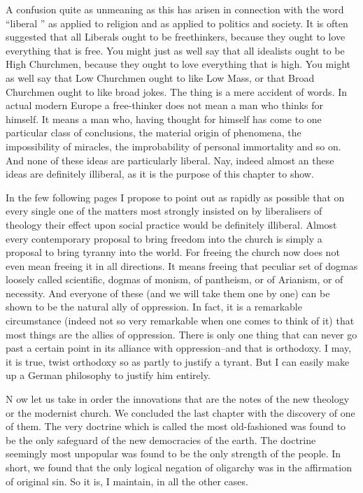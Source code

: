 \documentclass{book}
\begin{document}
A confusion quite as unmeaning as this has arisen in connection with the word “liberal ” as applied to religion and as applied to politics and society. It is often suggested that all Liberals ought to be freethinkers, because they ought to love everything that is free. You might just as well say that all idealists ought to be High Churchmen, because they ought to love everything that is high. You might as well say that Low Churchmen ought to like Low Mass, or that Broad Churchmen ought to like broad jokes. The thing is a mere accident of words. In actual modern Europe a free-thinker does not mean a man who thinks for himself. It means a man who, having thought for himself has come to one particular class of conclusions, the material origin of phenomena, the impossibility of miracles, the improbability of personal immortality and so on. And none of these ideas are particularly liberal. Nay, indeed almost an these ideas are definitely illiberal, as it is the purpose of this chapter to show.

In the few following pages I propose to point out as rapidly as possible that on every single one of the matters most strongly insisted on by liberalisers of theology their effect upon social practice would be definitely illiberal. Almost every contemporary proposal to bring freedom into the church is simply a proposal to bring tyranny into the world. For freeing the church now does not even mean freeing it in all directions. It means freeing that peculiar set of dogmas loosely called scientific, dogmas of monism, of pantheism, or of Arianism, or of necessity. And everyone of these (and we will take them one by one) can be shown to be the natural ally of oppression. In fact, it is a remarkable circumstance (indeed not so very remarkable when one comes to think of it) that most things are the allies of oppression. There is only one thing that can never go past a certain point in its alliance with oppression–and that is orthodoxy. I may, it is true, twist orthodoxy so as partly to justify a tyrant. But I can easily make up a German philosophy to justify him entirely.

N ow let us take in order the innovations that are the notes of the new theology or the modernist church. We concluded the last chapter with the discovery of one of them. The very doctrine which is called the most old-fashioned was found to be the only safeguard of the new democracies of the earth. The doctrine seemingly most unpopular was found to be the only strength of the people. In short, we found that the only logical negation of oligarchy was in the affirmation of original sin. So it is, I maintain, in all the other cases.
\end{document}
